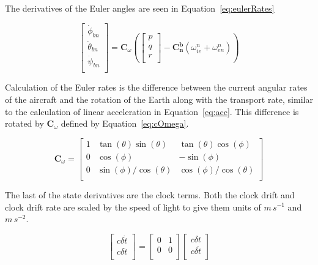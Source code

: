 The derivatives of the Euler angles are seen in Equation~\ref{eq:eulerRates}

\begin{equation}\label{eq:eulerRates}
    \begin{bmatrix}
        \dot{\phi}_{bn}   \\
        \dot{\theta}_{bn} \\
        \dot{\psi}_{bn}   \\
    \end{bmatrix} =
    \mathbf{C}_{\omega}
    \left(
    \begin{bmatrix}
            p \\
            q \\
            r \\
        \end{bmatrix} -
    \mathbf{C_n^b}\left(\omega_{ie}^n + \omega_{en}^n\right)
    \right)
\end{equation}

Calculation of the Euler rates is the difference between the current angular rates of the aircraft and the rotation of the Earth along with the transport rate, similar to the calculation of linear acceleration in Equation~\ref{eq:acc}. This difference is rotated by \(\mathbf{C}_{\omega}\) defined by Equation~\ref{eq:cOmega}.

\begin{equation}\label{eq:cOmega}
    \mathbf{C}_{\omega} =
    \begin{bmatrix}
        1 & \tan(\theta)\sin(\theta)    & \tan(\theta)\cos(\phi)      \\
        0 & \cos(\phi)                  & -\sin(\phi)                 \\
        0 & {\sin(\phi)}/{\cos(\theta)} & {\cos(\phi)}/{\cos(\theta)} \\
    \end{bmatrix}
\end{equation}

The last of the state derivatives are the clock terms. Both the clock drift and clock drift rate are scaled by the speed of light to give them units of \( m \, s^{-1}\) and \( m \, s^{-2}\).

\begin{equation}\label{eq:clkRates}
    \begin{bmatrix}
        c\delta \dot{t} \\
        c\delta\ddot{t} \\
    \end{bmatrix} =
    \begin{bmatrix}
        0 & 1 \\
        0 & 0 \\
    \end{bmatrix}
    \begin{bmatrix}
        c\delta {t}    \\
        c\delta\dot{t} \\
    \end{bmatrix}
\end{equation}

